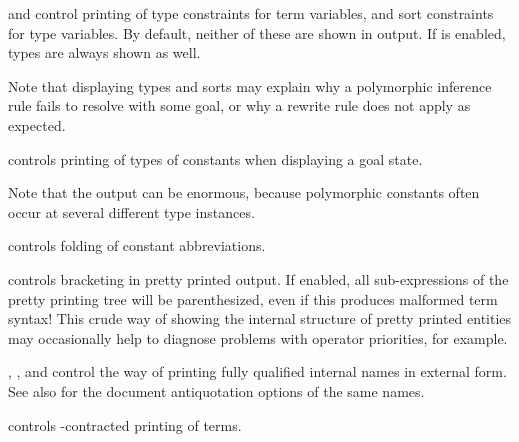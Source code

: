 \begin{isabellebody}
\begin{isamarkuptext}
\begin{description}
  \item \hyperlink{attribute.show-types}{\mbox{}} and \hyperlink{attribute.show-sorts}{\mbox{}} control
  printing of type constraints for term variables, and sort
  constraints for type variables.  By default, neither of these are
  shown in output.  If \hyperlink{attribute.show-sorts}{\mbox{}} is enabled, types are
  always shown as well.

  Note that displaying types and sorts may explain why a polymorphic
  inference rule fails to resolve with some goal, or why a rewrite
  rule does not apply as expected.

  \item \hyperlink{attribute.show-consts}{\mbox{}} controls printing of types of
  constants when displaying a goal state.

  Note that the output can be enormous, because polymorphic constants
  often occur at several different type instances.

  \item \hyperlink{attribute.show-abbrevs}{\mbox{}} controls folding of constant
  abbreviations.

  \item \hyperlink{attribute.show-brackets}{\mbox{}} controls bracketing in pretty
  printed output.  If enabled, all sub-expressions of the pretty
  printing tree will be parenthesized, even if this produces malformed
  term syntax!  This crude way of showing the internal structure of
  pretty printed entities may occasionally help to diagnose problems
  with operator priorities, for example.

  \item \hyperlink{attribute.names-long}{\mbox{}}, \hyperlink{attribute.names-short}{\mbox{}}, and
  \hyperlink{attribute.names-unique}{\mbox{}} control the way of printing fully
  qualified internal names in external form.  See also
   for the document antiquotation options of the
  same names.

  \item \hyperlink{attribute.eta-contract}{\mbox{}} controls -contracted
  printing of terms.


\end{description}
\end{isamarkuptext}
\end{isabellebody}
